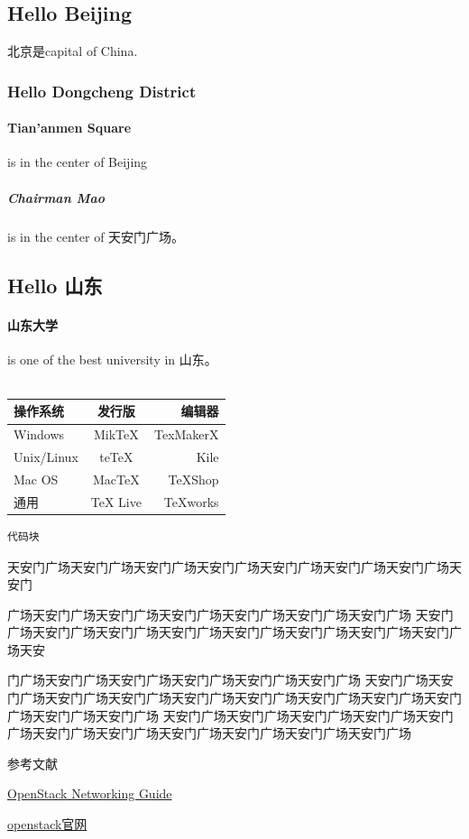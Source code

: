 \documentclass[a4paper,left=1.5cm,right=1.5cm,11pt]{article}
\def\hang{\hangindent\parindent}
\def\textindent#1{\indent\llap{#1\enspace}\ignorespaces}
\def\re{\par\hang\textindent}
\begin{document}
\subsection{Hello Beijing}
北京是capital of China.
\subsubsection{Hello Dongcheng District}
\paragraph{Tian'anmen Square}
is in the center of Beijing
\subparagraph{Chairman Mao}
is in the center of 天安门广场。
\subsection{Hello 山东}
\paragraph{山东大学} is one of the best university in 山东。\\\\
\begin{center}
\begin{tabular}{|l|c|r|}
 \hline
操作系统& 发行版& 编辑器\\
 \hline
Windows & MikTeX & TexMakerX \\
 \hline
Unix/Linux & teTeX & Kile \\
 \hline
Mac OS & MacTeX & TeXShop \\
 \hline
通用& TeX Live & TeXworks \\
 \hline
\end{tabular}
\end{center}
\begin{lstlisting}
代码块
\end{lstlisting}
天安门广场天安门广场天安门广场天安门广场天安门广场天安门广场天安门广场天安门\par
广场天安门广场天安门广场天安门广场天安门广场天安门广场天安门广场
天安门广场天安门广场天安门广场天安门广场天安门广场天安门广场天安门广场天安门广场天安\par
门广场天安门广场天安门广场天安门广场天安门广场天安门广场
天安门广场天安门广场天安门广场天安门广场天安门广场天安门广场天安门广场天安门广场天安门广场天安门广场天安门广场
天安门广场天安门广场天安门广场天安门广场天安门广场天安门广场天安门广场天安门广场天安门广场天安门广场天安门广场
\clearpage
\begin{center}%
参考文献
\end{center}
\re{[1]} \href{https://docs.openstack.org/mitaka/networking-guide/}{OpenStack Networking Guide}  
\re{[2]} \href{https://docs.openstack.org/mitaka/}{openstack官网}
\end{document}
